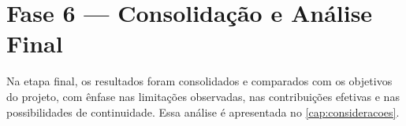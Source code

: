 \section{Fase 6 --- Consolidação e Análise Final}

Na etapa final, os resultados foram consolidados e comparados com os objetivos
do projeto, com ênfase nas limitações observadas, nas contribuições efetivas e
nas possibilidades de continuidade. Essa análise é apresentada no
\autoref{cap:consideracoes}.

